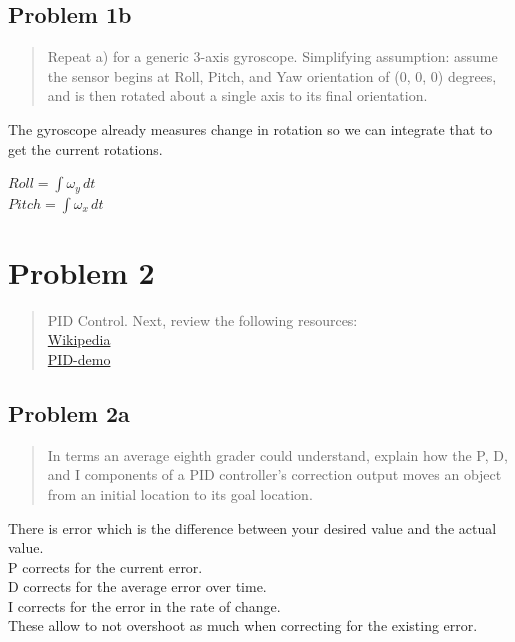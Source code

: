 \documentclass[10pt,a4paper]{article}
\let\oldsubsection\subsection
\renewcommand{\subsection}{%
    \setcounter{equation}{0}%
    \oldsubsection%
}
\begin{document}
\subsection{Problem 1b}\begin{quote}
Repeat a) for a generic 3-axis gyroscope. Simplifying assumption: assume the sensor begins at Roll,
Pitch, and Yaw orientation of (0, 0, 0) degrees, and is then rotated about a single axis to its final
orientation.
\end{quote}

The gyroscope already measures change in rotation so we can integrate that to get the current rotations.

$Roll = \int \omega_y \, dt$\\

$Pitch = \int \omega_x \, dt$\\


\section{Problem 2}
\begin{quote}
PID Control. Next, review the following resources:\\
\href{http://en.wikipedia.org/wiki/PID_controller}{Wikipedia}\\
\href{https://sites.google.com/site/fpgaandco/pid-demo}{PID-demo}\\
\end{quote}

\subsection{Problem 2a}\begin{quote}
In terms an average eighth grader could understand, explain how the P, D, and I components of a PID
controller’s correction output moves an object from an initial location to its goal location.\\
\end{quote}

There is error which is the difference between your desired value and the actual value.\\

P corrects for the current error.\\
D corrects for the average error over time.\\
I corrects for the error in the rate of change.\\

These allow to not overshoot as much when correcting for the existing error.\\
\end{document}
